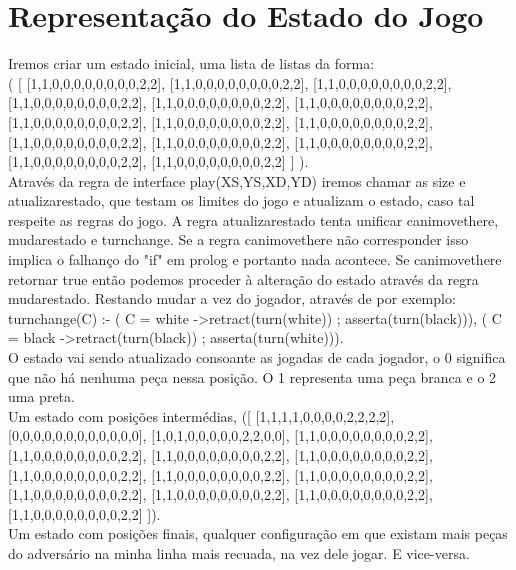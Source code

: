 \documentclass[a4paper]{article}
\begin{document}

\section{Representação do Estado do Jogo}
Iremos criar um estado inicial, uma lista de listas da forma:
\\\linebreak ( [ [1,1,0,0,0,0,0,0,0,0,2,2], [1,1,0,0,0,0,0,0,0,0,2,2], [1,1,0,0,0,0,0,0,0,0,2,2],
          [1,1,0,0,0,0,0,0,0,0,2,2], [1,1,0,0,0,0,0,0,0,0,2,2], [1,1,0,0,0,0,0,0,0,0,2,2],
          [1,1,0,0,0,0,0,0,0,0,2,2], [1,1,0,0,0,0,0,0,0,0,2,2], [1,1,0,0,0,0,0,0,0,0,2,2],
          [1,1,0,0,0,0,0,0,0,0,2,2], [1,1,0,0,0,0,0,0,0,0,2,2], [1,1,0,0,0,0,0,0,0,0,2,2],
          [1,1,0,0,0,0,0,0,0,0,2,2], [1,1,0,0,0,0,0,0,0,0,2,2] ] ).
\\\linebreak
Através da regra de interface play(XS,YS,XD,YD) iremos chamar as size e atualizarestado, que testam os limites do jogo e atualizam o estado, caso tal respeite as regras do jogo. A regra atualizarestado tenta unificar canimovethere, mudarestado e turnchange. Se a regra canimovethere não corresponder isso implica o falhanço do "if" em prolog e portanto nada acontece. Se canimovethere retornar true então podemos proceder à alteração do estado através da regra mudarestado. Restando mudar a vez do jogador, através de por exemplo:
\\\linebreak
turnchange(C) :-
  ( C = white -\textgreater retract(turn(white)) ; asserta(turn(black))),
  ( C = black -\textgreater retract(turn(black)) ; asserta(turn(white))).
\\\linebreak
O estado vai sendo atualizado consoante as jogadas de cada jogador, o 0 significa que não há nenhuma peça nessa posição. O 1 representa uma peça branca e o 2 uma preta.
\\\linebreak Um estado com posições intermédias, ([ [1,1,1,1,0,0,0,0,2,2,2,2], [0,0,0,0,0,0,0,0,0,0,0,0], [1,0,1,0,0,0,0,0,2,2,0,0],
          [1,1,0,0,0,0,0,0,0,0,2,2], [1,1,0,0,0,0,0,0,0,0,2,2], [1,1,0,0,0,0,0,0,0,0,2,2],
          [1,1,0,0,0,0,0,0,0,0,2,2], [1,1,0,0,0,0,0,0,0,0,2,2], [1,1,0,0,0,0,0,0,0,0,2,2],
          [1,1,0,0,0,0,0,0,0,0,2,2], [1,1,0,0,0,0,0,0,0,0,2,2], [1,1,0,0,0,0,0,0,0,0,2,2],
        [1,1,0,0,0,0,0,0,0,0,2,2], [1,1,0,0,0,0,0,0,0,0,2,2] ]).
\\\linebreak
Um estado com posições finais, qualquer configuração em que existam mais peças do adversário na minha linha mais recuada, na vez dele jogar. E vice-versa.
\end{document}
